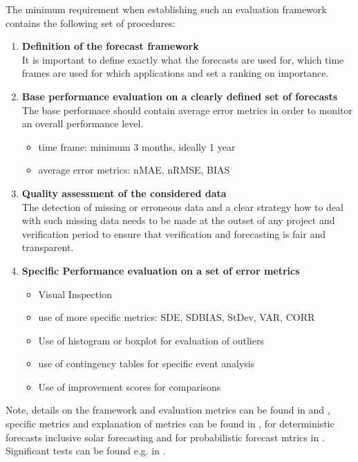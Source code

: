 The minimum requirement when establishing such an evaluation framework contains the following set of procedures: 
\begin{enumerate}
    \item \textbf{Definition of the forecast framework} \\
        It is important to define exactly what the forecasts are used for, which time frames are used for which applications and set a ranking on importance.

    \item \textbf{Base performance evaluation on a clearly defined set of forecasts} \\
     The base performace should contain average error metrics in order to monitor an overall performance level.
        \begin{itemize}
            \item time frame:  minimum 3 months, ideally 1 year
            \item average error metrics: nMAE, nRMSE, BIAS
        \end{itemize}
    
    \item \textbf{Quality assessment of  the  considered  data}  \\
        The detection  of  missing  or  erroneous  data and a clear strategy how to deal with such missing data needs to be made at the outset of any project and verification period to ensure that verification and forecasting is fair and transparent.
    
    \item \textbf{Specific Performance evaluation on a set of error metrics} \\ 
       \begin{itemize}
            \item Visual Inspection
            \item use of more specific metrics: SDE, SDBIAS, StDev, VAR, CORR
            \item Use of histogram or boxplot for evaluation of outliers
            \item use of contingency tables for specific event analysis
            \item Use of improvement scores for comparisons
       \end{itemize}
    
\end{enumerate}

Note, details on the framework and evaluation metrics can be found in  \cite{madsen2005} and \cite{messner}, specific metrics and explanation of metrics can be found in \cite{jensen}, \citet{zhang2015} for deterministic forecasts inclusive solar forecasting and for probabilistic forecast mtrics in \cite{anemosplus}. Significant tests can be found e.g. in \cite{vogt2018}.



